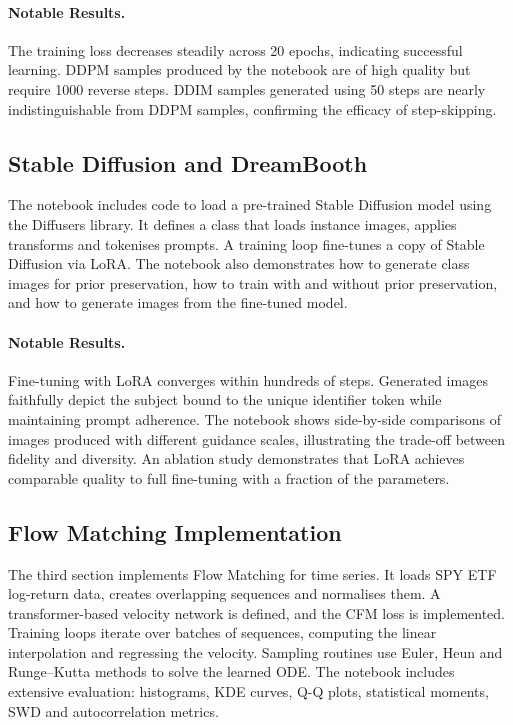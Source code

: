 \paragraph{Notable Results.}  The training loss decreases steadily
across 20 epochs, indicating successful learning.  DDPM samples
produced by the notebook are of high quality but require 1000
reverse steps.  DDIM samples generated using 50 steps are nearly
indistinguishable from DDPM samples, confirming the efficacy of
step-skipping.

\subsection{Stable Diffusion and DreamBooth}

The notebook includes code to load a pre-trained Stable Diffusion
model using the Diffusers library.  It defines a 
class that loads instance images, applies transforms and tokenises
prompts.  A training loop fine-tunes a copy of Stable Diffusion via
LoRA.  The notebook also demonstrates how to generate class images
for prior preservation, how to train with and without prior
preservation, and how to generate images from the fine-tuned model.

\paragraph{Notable Results.}  Fine-tuning with LoRA converges within
hundreds of steps.  Generated images faithfully depict the subject
bound to the unique identifier token while maintaining prompt
adherence.  The notebook shows side-by-side comparisons of images
produced with different guidance scales, illustrating the trade-off
between fidelity and diversity.  An ablation study demonstrates
that LoRA achieves comparable quality to full fine-tuning with a
fraction of the parameters.

\subsection{Flow Matching Implementation}

The third section implements Flow Matching for time series.  It
loads SPY ETF log-return data, creates overlapping sequences and
normalises them.  A transformer-based velocity network is defined,
and the CFM loss is implemented.  Training loops iterate over
batches of sequences, computing the linear interpolation and
regressing the velocity.  Sampling routines use Euler, Heun and
Runge–Kutta methods to solve the learned ODE.  The notebook
includes extensive evaluation: histograms, KDE curves, Q-Q plots,
statistical moments, SWD and autocorrelation metrics.

